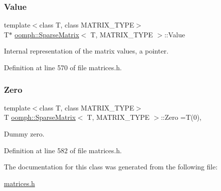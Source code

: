 \subsubsection{\texorpdfstring{Value}{Value}}
{\footnotesize\ttfamily template$<$class T, class M\+A\+T\+R\+I\+X\+\_\+\+T\+Y\+PE$>$ \\
T$\ast$ \hyperlink{classoomph_1_1SparseMatrix}{oomph\+::\+Sparse\+Matrix}$<$ T, M\+A\+T\+R\+I\+X\+\_\+\+T\+Y\+PE $>$\+::Value\hspace{0.3cm}{\ttfamily [protected]}}



Internal representation of the matrix values, a pointer. 



Definition at line 570 of file matrices.\+h.

\mbox{\label{classoomph_1_1SparseMatrix_a71a5ae159c26f93c314c839f4db6eaaf}} 
\subsubsection{\texorpdfstring{Zero}{Zero}}
{\footnotesize\ttfamily template$<$class T, class M\+A\+T\+R\+I\+X\+\_\+\+T\+Y\+PE$>$ \\
T \hyperlink{classoomph_1_1SparseMatrix}{oomph\+::\+Sparse\+Matrix}$<$ T, M\+A\+T\+R\+I\+X\+\_\+\+T\+Y\+PE $>$\+::Zero =T(0)\hspace{0.3cm}{\ttfamily [static]}, {\ttfamily [protected]}}



Dummy zero. 



Definition at line 582 of file matrices.\+h.



The documentation for this class was generated from the following file\+:\begin{DoxyCompactItemize}
\item 
\hyperlink{matrices_8h}{matrices.\+h}\end{DoxyCompactItemize}
